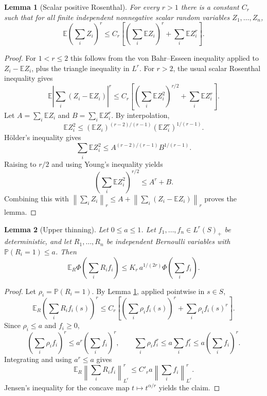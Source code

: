 \documentclass[11pt]{article}
\newtheorem{lemma}{Lemma}
\newcommand{\E}{\mathbb E}
\newcommand{\Pp}{\mathbb P}
\newcommand{\norm}[1]{\left\lVert #1\right\rVert}
\newcommand{\PhiF}{\Phi}
\begin{document}
\begin{lemma}[Scalar positive Rosenthal]
\label{lem:positive-rosenthal}
For every \(r>1\) there is a constant \(C_r\) such that for all finite
independent nonnegative scalar random variables \(Z_1,\ldots,Z_n\),
\[
  \E\left(\sum_i Z_i\right)^r
  \le
  C_r\left[
      \left(\sum_i \E Z_i\right)^r
      +
      \sum_i \E Z_i^r
    \right].
\]
\end{lemma}

\begin{proof}
For \(1<r\le2\) this follows from the von Bahr--Esseen inequality applied to
\(Z_i-\E Z_i\), plus the triangle inequality in \(L^r\).  For \(r>2\), the
usual scalar Rosenthal inequality gives
\[
  \E\left|\sum_i(Z_i-\E Z_i)\right|^r
  \le
  C_r\left[
    \left(\sum_i \E Z_i^2\right)^{r/2}
    +
    \sum_i \E Z_i^r
  \right].
\]
Let \(A=\sum_i\E Z_i\) and \(B=\sum_i\E Z_i^r\).  By interpolation,
\[
  \E Z_i^2
  \le
  (\E Z_i)^{(r-2)/(r-1)}(\E Z_i^r)^{1/(r-1)}.
\]
Hölder's inequality gives
\[
  \sum_i \E Z_i^2
  \le
  A^{(r-2)/(r-1)}B^{1/(r-1)}.
\]
Raising to \(r/2\) and using Young's inequality yields
\[
  \left(\sum_i \E Z_i^2\right)^{r/2}
  \le
  A^r+B.
\]
Combining this with
\(\norm{\sum_i Z_i}_r\le A+\norm{\sum_i(Z_i-\E Z_i)}_r\) proves the lemma.
\end{proof}

\begin{lemma}[Upper thinning]
\label{lem:upper-thin}
Let \(0\le a\le1\).  Let \(f_1,\ldots,f_n\in L^r(S)_+\) be deterministic, and
let \(R_1,\ldots,R_n\) be independent Bernoulli variables with
\(\Pp(R_i=1)\le a\).  Then
\[
  \E_R\PhiF\left(\sum_i R_i f_i\right)
  \le
  K_r\, a^{1/(2r)}
  \PhiF\left(\sum_i f_i\right).
\]
\end{lemma}

\begin{proof}
Let \(\rho_i=\Pp(R_i=1)\).  By Lemma \ref{lem:positive-rosenthal}, applied
pointwise in \(s\in S\),
\[
  \E_R\left(\sum_i R_i f_i(s)\right)^r
  \le
  C_r\left[
    \left(\sum_i \rho_i f_i(s)\right)^r
    +
    \sum_i \rho_i f_i(s)^r
  \right].
\]
Since \(\rho_i\le a\) and \(f_i\ge0\),
\[
  \left(\sum_i \rho_i f_i\right)^r\le a^r\left(\sum_i f_i\right)^r,
  \qquad
  \sum_i \rho_i f_i^r\le a\sum_i f_i^r\le a\left(\sum_i f_i\right)^r.
\]
Integrating and using \(a^r\le a\) gives
\[
  \E_R\norm{\sum_i R_i f_i}_{L^r}^r
  \le
  C'_r a\norm{\sum_i f_i}_{L^r}^r.
\]
Jensen's inequality for the concave map \(t\mapsto t^{\alpha/r}\) yields the
claim.
\end{proof}
\end{document}

